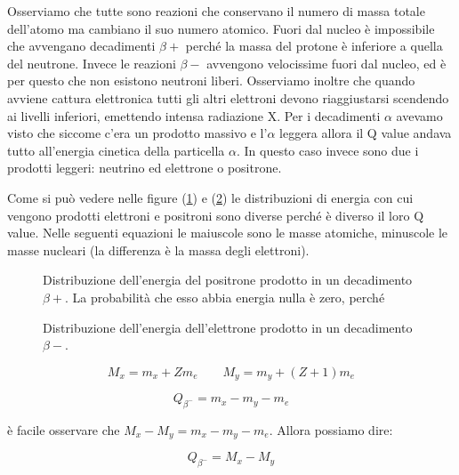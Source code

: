 Osserviamo che tutte sono reazioni che conservano il numero di massa totale dell'atomo ma cambiano il suo numero atomico.
Fuori dal nucleo è impossibile che avvengano decadimenti $\beta+$ perché la massa del protone è inferiore a quella del neutrone. Invece le reazioni $\beta-$ avvengono velocissime fuori dal nucleo, ed è per questo che non esistono neutroni liberi.
Osserviamo inoltre che quando avviene cattura elettronica tutti gli altri elettroni devono riaggiustarsi scendendo ai livelli inferiori, emettendo intensa radiazione X.
Per i decadimenti $\alpha$ avevamo visto che siccome c'era un prodotto massivo e l'$\alpha$ leggera allora il Q value andava tutto all'energia cinetica della particella $\alpha$. In questo caso invece sono due i prodotti leggeri: neutrino ed elettrone o positrone.

 Come si può vedere nelle figure (\ref{qbetapiu}) e (\ref{qbetameno}) le distribuzioni di energia con cui vengono prodotti elettroni e positroni sono diverse perché è diverso il loro Q value. Nelle seguenti equazioni le maiuscole sono le masse atomiche, minuscole le masse nucleari (la differenza è la massa degli elettroni).

\begin{figure} []
\centering
		\caption{Distribuzione dell'energia del positrone prodotto in un decadimento $\beta+$. La probabilità che esso abbia energia nulla è zero, perché}
         \label{qbetapiu}
\end{figure}

\begin{figure} []
\centering
		\caption{Distribuzione dell'energia dell'elettrone prodotto in un decadimento $\beta-$.}
         \label{qbetameno}
\end{figure}

\begin{equation}
M_x=m_x+Zm_e 	\qquad M_y=m_y+(Z+1)m_e
\end{equation}

\begin{equation}
Q_{\beta^-}=m_x-m_y-m_e
\end{equation}

è facile osservare che $M_x-M_y=m_x-m_y-m_e$. Allora possiamo dire:

\begin{equation}
Q_{\beta^-}=M_x-M_y
\end{equation}

